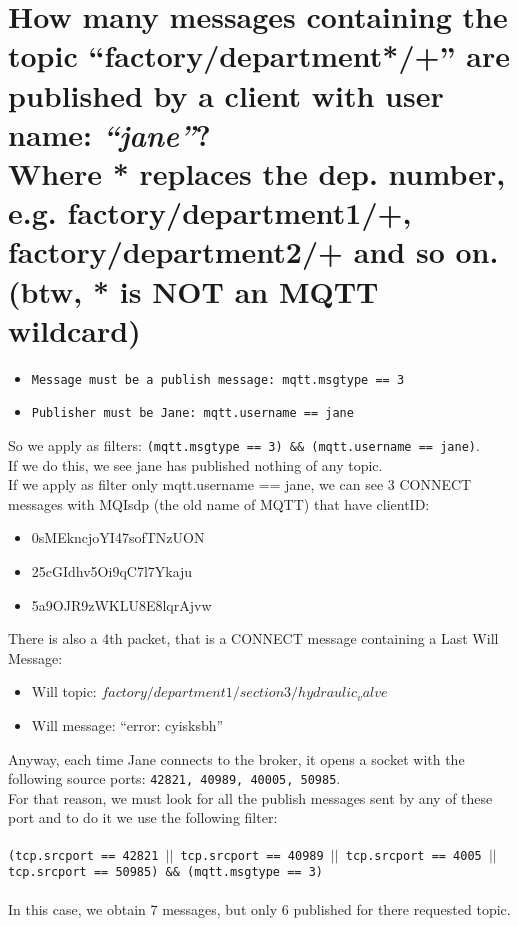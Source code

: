 \documentclass{article} %
\begin{document}
 \section[Section Title. Section Subtitle]{\large{How many messages containing the topic “factory/department*/+” are published by a client with user name:
 \textit{“jane”}?} \\ {\normalsize{Where * replaces the dep. number, e.g. factory/department1/+, factory/department2/+ and so on. (btw, * is NOT an MQTT wildcard)}}}
    \begin{itemize}
        \item \texttt{Message must be a publish message: mqtt.msgtype == 3}
        \item \texttt{Publisher must be Jane: mqtt.username == jane}
    \end{itemize}
    So we apply as filters: \texttt{(mqtt.msgtype == 3) \&\& (mqtt.username == jane)}.\\
    If we do this, we see jane has published nothing of any topic. \\
    If we apply as filter only mqtt.username == jane, we can see 3 CONNECT messages with MQIsdp (the old name of MQTT) that have clientID:
    \begin{itemize}
        \item 0sMEkncjoYI47sofTNzUON
        \item 25cGIdhv5Oi9qC7l7Ykaju
        \item 5a9OJR9zWKLU8E8lqrAjvw
    \end{itemize}
    There is also a 4th packet, that is a CONNECT message containing a Last Will Message:
    \begin{itemize}
        \item Will topic: \texttt{$factory/department1/section3/hydraulic_valve$}
        \item Will message: “error: cyisksbh”
    \end{itemize}
    
    Anyway, each time Jane connects to the broker, it opens a socket with the following source ports: \texttt{42821, 40989, 40005, 50985}.\\
    For that reason, we must look for all the publish messages sent by any of these port and to do it we use the following filter: \\ \\
    \texttt{(tcp.srcport == 42821 $||$ tcp.srcport == 40989 $||$ tcp.srcport == 4005 $||$ tcp.srcport == 50985) \&\& (mqtt.msgtype == 3)} \\ \\
    In this case, we obtain 7 messages, but only 6 published for there requested topic. \\
    
\end{document}
